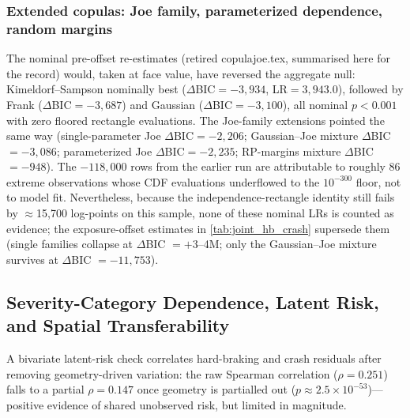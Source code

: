 \documentclass[letterpaper,8pt]{extarticle}  %
\newcommand{\file}[1]{{\ttfamily\def\_{\textunderscore\allowbreak}#1}}
\begin{document}
\begin{doublespacing}
\begin{linenumbers}
\subsubsection{Extended copulas: Joe family, parameterized dependence, random margins}

The nominal pre-offset re-estimates (retired \file{copula\_joe.tex}, summarised here for the record) would, taken at face value, have reversed the aggregate null: Kimeldorf--Sampson nominally best ($\Delta$BIC$=-3{,}934$, LR$=3{,}943.0$), followed by Frank ($\Delta$BIC$=-3{,}687$) and Gaussian ($\Delta$BIC$=-3{,}100$), all nominal $p<0.001$ with zero floored rectangle evaluations. The Joe-family extensions pointed the same way (single-parameter Joe $\Delta$BIC$=-2{,}206$; Gaussian--Joe mixture $\Delta$BIC$=-3{,}086$; parameterized Joe $\Delta$BIC$=-2{,}235$; RP-margins mixture $\Delta$BIC$=-948$). The $-118{,}000$ rows from the earlier run are attributable to roughly 86 extreme observations whose CDF evaluations underflowed to the $10^{-300}$ floor, not to model fit. Nevertheless, because the independence-rectangle identity still fails by $\approx$15{,}700 log-points on this sample, none of these nominal LRs is counted as evidence; the exposure-offset estimates in \cref{tab:joint_hb_crash} supersede them (single families collapse at $\Delta$BIC $=+$3--4M; only the Gaussian--Joe mixture survives at $\Delta$BIC $=-11{,}753$).



\FloatBarrier

\subsection{Severity-Category Dependence, Latent Risk, and Spatial Transferability}\label{sec:hbcat-results}

A bivariate latent-risk check correlates hard-braking and crash residuals after removing geometry-driven variation: the raw Spearman correlation ($\rho=0.251$) falls to a partial $\rho=0.147$ once geometry is partialled out ($p \approx 2.5\times10^{-53}$)---positive evidence of shared unobserved risk, but limited in magnitude.


\end{linenumbers}
\end{doublespacing}
\end{document}
